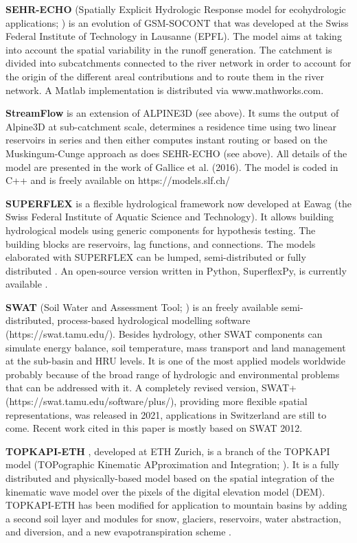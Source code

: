 \documentclass[10pt,a4paper]{article}
\begin{document}
\textbf{SEHR-ECHO} (Spatially Explicit Hydrologic Response model for ecohydrologic applications; \citealp{Schaefli2014}) is an evolution of GSM-SOCONT that was developed at the Swiss Federal Institute of Technology in Lausanne (EPFL). The model aims at taking into account the spatial variability in the runoff generation. The catchment is divided into subcatchments connected to the river network in order to account for the origin of the different areal contributions and to route them in the river network. A Matlab implementation is distributed via www.mathworks.com.

\textbf{StreamFlow} is an extension of ALPINE3D (see above). It sums the output of Alpine3D at sub-catchment scale, determines a residence time using two linear reservoirs in series \citep{Comola2015} and then either computes instant routing or based on the Muskingum-Cunge approach as does SEHR-ECHO (see above). All details of the model are presented in the work of Gallice et al. (2016). The model is coded in C++ and is freely available on https://models.slf.ch/

\textbf{SUPERFLEX} \citep{Fenicia2011a, Kavetski2011} is a flexible hydrological framework now developed at Eawag (the Swiss Federal Institute of Aquatic Science and Technology). It allows building hydrological models using generic components for hypothesis testing. The building blocks are reservoirs, lag functions, and connections. The models elaborated with SUPERFLEX can be lumped, semi-distributed \citep{Fenicia2016} or fully distributed \citep{Hostache2020}. An open-source version written in Python, SuperflexPy, is currently available \citet{DalMolin2020a}.

\textbf{SWAT} (Soil Water and Assessment Tool; \citealp{Arnold1998}) is an freely available semi-distributed, process-based hydrological modelling software (https://swat.tamu.edu/). Besides hydrology, other SWAT components can simulate energy balance, soil temperature, mass transport and land management at the sub-basin and HRU levels. It is one of the most applied models worldwide probably because of the broad range of hydrologic and environmental problems that can be addressed with it. A completely revised version, SWAT+ (https://swat.tamu.edu/software/plus/), providing more flexible spatial representations, was released in 2021, applications in Switzerland are still to come. Recent work cited in this paper is mostly based on SWAT 2012.

\textbf{TOPKAPI-ETH} \citep{Finger2011, Ragettli2012}, developed at ETH Zurich, is a branch of the TOPKAPI model (TOPographic Kinematic APproximation and Integration; \citealp{Todini1995, Todini2002, Liu2002, Ciarapica2002}).  It is a fully distributed and physically-based model based on the spatial integration  of the kinematic wave model over the pixels of the digital elevation model (DEM). TOPKAPI-ETH has been modified for application to mountain basins by adding a second soil layer and modules for snow, glaciers, reservoirs, water abstraction, and diversion, and a new evapotranspiration scheme \citep{Finger2011, Finger2012, Fatichi2015}. 
\end{document}
